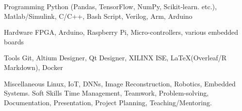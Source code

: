 

\begin{cvskills}

  \cvskill
    {Programming} %
    {Python (Pandas, TensorFlow, NumPy, Scikit‑learn. etc.), Matlab/Simulink, C/C++, Bash Script, Verilog, Arm, Arduino} %

  \cvskill
    {Hardware} %
    {FPGA, Arduino, Raspberry Pi, Micro-controllers, various embedded boards} %

  \cvskill
    {Tools} %
    {Git, Altium Designer, Qt Designer, XILINX ISE, \LaTeX (Overleaf/R Markdown), Docker} %
    
  \cvskill
    {Miscellaneous} %
    {Linux, IoT, DNNs, Image Reconstruction, Robotics, Embedded Systems.} %
  \cvskill
    {Soft Skills} %
    {Time Management, Teamwork, Problem-solving, Documentation, Presentation, Project Planning, Teaching/Mentoring.} %

\end{cvskills}
